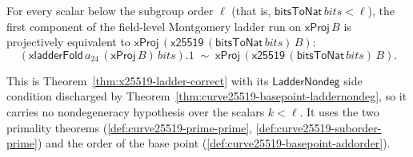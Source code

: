 \begin{theorem}
  \label{thm:x25519-ladder-correct-basepoint}
  \leanok
  For every scalar below the subgroup order $\ell$ (that is,
  $\mathsf{bitsToNat}\,bits < \ell$),
  the first component of the field-level Montgomery ladder run on $\mathsf{xProj}\,B$ is
  projectively equivalent to $\mathsf{xProj}\,(\mathsf{x25519}\,(\mathsf{bitsToNat}\,bits)\,B)$:
  \[
    (\mathsf{xladderFold}\,a_{24}\,(\mathsf{xProj}\,B)\,bits).1
      \;\sim\; \mathsf{xProj}\,(\mathsf{x25519}\,(\mathsf{bitsToNat}\,bits)\,B).
  \]
\end{theorem}

This is Theorem~\ref{thm:x25519-ladder-correct} with its $\mathsf{LadderNondeg}$ side
condition discharged by Theorem~\ref{thm:curve25519-basepoint-laddernondeg}, so it
carries no nondegeneracy hypothesis over the scalars $k < \ell$. It uses the two
primality theorems (\ref{def:curve25519-prime-prime},
\ref{def:curve25519-suborder-prime}) and the order of the base point
(\ref{def:curve25519-basepoint-addorder}).
